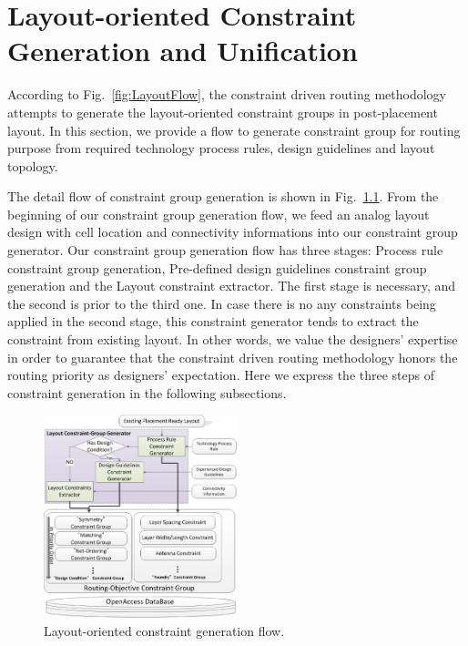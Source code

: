 \chapter{Layout-oriented Constraint Generation and Unification}\label{chap:cg}


  According to Fig.~\ref{fig:LayoutFlow}, the constraint driven routing methodology attempts to generate the layout-oriented constraint groups in post-placement layout. In this section, we provide a flow to generate constraint group for routing purpose from required technology process rules, design guidelines and layout topology. 
  
  The detail flow of constraint group generation is shown in Fig.~\ref{fig:LayoutCGGen}. From the beginning of our constraint group generation flow, we feed an analog layout design with cell location and connectivity informations into our constraint group generator. Our constraint group generation flow has three stages: Process rule constraint group generation, Pre-defined design guidelines constraint group generation and the Layout constraint extractor. The first stage is necessary, and the second is prior to the third one. In case there is no any constraints being applied in the second stage, this constraint generator tends to extract the constraint from existing layout. In other words, we value the designers' expertise in order to guarantee that the constraint driven routing methodology honors the routing priority as designers' expectation. Here we express the three steps of constraint generation in the following subsections. 
  
  \begin{figure}[t]
    \centering
      \includegraphics[width=0.5\textwidth]{Fig/CG/LayoutConGen.eps}
      \caption{Layout-oriented constraint generation flow.}
      \label{fig:LayoutCGGen}
  \end{figure}


